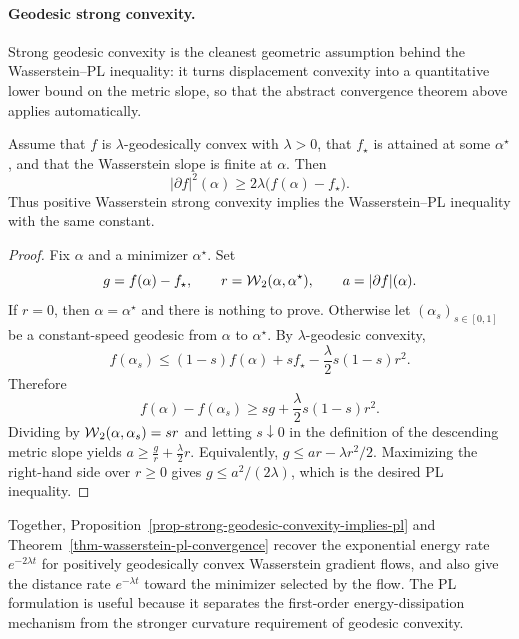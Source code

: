 \paragraph{Geodesic strong convexity.}
Strong geodesic convexity is the cleanest geometric assumption behind the Wasserstein--PL inequality: it turns displacement convexity into a quantitative lower bound on the metric slope, so that the abstract convergence theorem above applies automatically.

\begin{prop}\label{prop-strong-geodesic-convexity-implies-pl}
	Assume that \(f\) is \(\lambda\)-geodesically convex with \(\lambda>0\), that \(f_\star\) is attained at some \(\alpha^\star\), and that the Wasserstein slope is finite at \(\alpha\). Then
	\[
		|\partial f|^2(\alpha)
		\geq
		2\lambda\bigl(f(\alpha)-f_\star\bigr).
	\]
	Thus positive Wasserstein strong convexity implies the Wasserstein--PL inequality with the same constant.
\end{prop}

\begin{proof}
	Fix \(\alpha\) and a minimizer \(\alpha^\star\). Set
	\[
		g=f(\alpha)-f_\star,\qquad
		r=\operatorname{\mathcal{W}}_2(\alpha,\alpha^\star),\qquad
		a=|\partial f|(\alpha).
	\]
	If \(r=0\), then \(\alpha=\alpha^\star\) and there is nothing to prove. Otherwise let \((\alpha_s)_{s\in[0,1]}\) be a constant-speed geodesic from \(\alpha\) to \(\alpha^\star\). By \(\lambda\)-geodesic convexity,
	\[
		f(\alpha_s)
		\leq
		(1-s)f(\alpha)+s f_\star
		-\frac{\lambda}{2}s(1-s)r^2.
	\]
	Therefore
	\[
		f(\alpha)-f(\alpha_s)
		\geq
		s g+\frac{\lambda}{2}s(1-s)r^2.
	\]
	Dividing by \(\operatorname{\mathcal{W}}_2(\alpha,\alpha_s)=sr\) and letting \(s\downarrow0\) in the definition of the descending metric slope yields
	\(a\geq \frac{g}{r}+\frac{\lambda}{2}r\).
	Equivalently, \(g\leq ar-\lambda r^2/2\). Maximizing the right-hand side over \(r\geq0\) gives \(g\leq a^2/(2\lambda)\), which is the desired PL inequality.
\end{proof}

Together, Proposition~\ref{prop-strong-geodesic-convexity-implies-pl} and Theorem~\ref{thm-wasserstein-pl-convergence} recover the exponential energy rate \(e^{-2\lambda t}\) for positively geodesically convex Wasserstein gradient flows, and also give the distance rate \(e^{-\lambda t}\) toward the minimizer selected by the flow. The PL formulation is useful because it separates the first-order energy-dissipation mechanism from the stronger curvature requirement of geodesic convexity.

